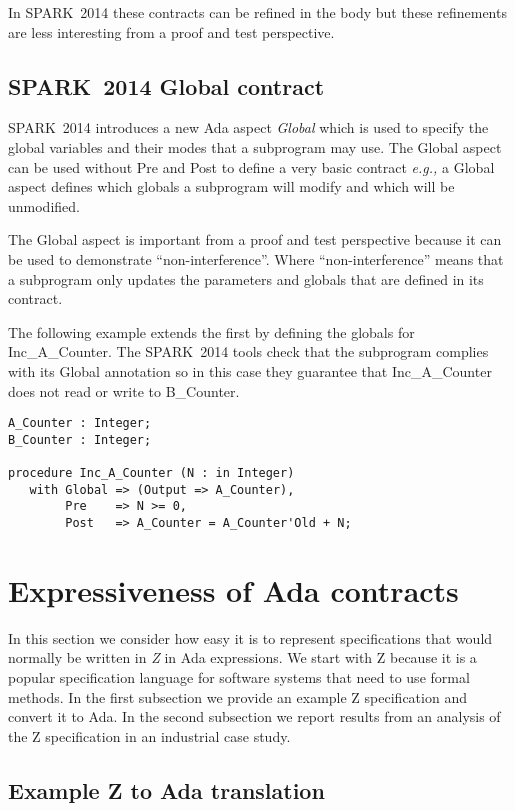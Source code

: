 \documentclass{llncs}
\newcommand{\newspark}{SPARK~2014\xspace}
\newcommand{\ada}{Ada\xspace}
\newcommand{\eg}{\textit{e.g.,}\xspace}
\begin{document}
In \newspark these contracts can be refined in the body but these
refinements are less interesting from a proof and test perspective.

\subsection{\newspark Global contract}

\newspark introduces a new \ada aspect \emph{Global} which is used to
specify the global variables and their modes that a subprogram may
use. The Global aspect can be used without Pre and Post to define a
very basic contract \eg a Global aspect defines which globals a
subprogram will modify and which will be unmodified.

The Global aspect is important from a proof and test perspective
because it can be used to demonstrate ``non-interference''. Where
``non-interference'' means that a subprogram only updates the
parameters and globals that are defined in its contract.

The following example extends the first by defining the globals for
Inc\_A\_Counter. The \newspark tools check that the subprogram
complies with its Global annotation so in this case they guarantee
that Inc\_A\_Counter does not read or write to B\_Counter.

\begin{lstlisting}[language=SPARK]
A_Counter : Integer;
B_Counter : Integer;

procedure Inc_A_Counter (N : in Integer)
   with Global => (Output => A_Counter),
        Pre    => N >= 0,
        Post   => A_Counter = A_Counter'Old + N;
\end{lstlisting}


\section{Expressiveness of Ada contracts}

In this section we consider how easy it is to represent specifications
that would normally be written in \emph{Z} in Ada expressions. We
start with Z because it is a popular specification language for
software systems that need to use formal methods. In the first
subsection we provide an example Z specification and convert it to
Ada. In the second subsection we report results from an analysis of
the Z specification in an industrial case study.

\subsection{Example Z to Ada translation}
\end{document}
